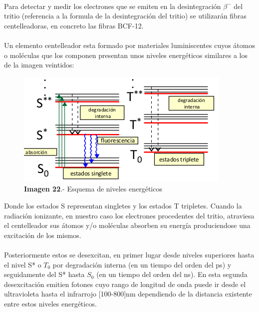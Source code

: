 \documentclass[11pt, a4paper]{article}
\begin{document}
\paragraph {}
Para detectar y medir los electrones que se emiten en la desintegración $\beta^-$ del tritio (referencia a la formula de la desintegración del tritio) se utilizarán fibras centelleadoras, en concreto las fibras BCF-12. 

\paragraph {}
Un elemento centelleador esta formado por materiales luminiscentes cuyos átomos o moléculas que los componen presentan unos niveles energéticos similares a los de la imagen veintidos:

\begin{figure}[hbtp]
\centering
\includegraphics[scale=0.5]{EsquemaNivelesFIbras.png}
\caption{\textbf{Imagen 22}.- Esquema de niveles energéticos}
\end{figure}

Donde los estados S representan singletes y los estados T tripletes. Cuando la radiación ionizante, en nuestro caso los electrones procedentes del tritio, atraviesa el centelleador sus átomos y/o moléculas absorben su energía produciendose una excitación de los mismos. 

\paragraph {}
Posteriormente estos se desexcitan, en primer lugar desde niveles superiores hasta el nivel S* o $T_0$ por degradación interna (en un tiempo del orden del ps) y seguidamente del S* hasta $S_0$ (en un tiempo del orden del ns). En esta segunda desexcitación emitien fotones cuyo rango de longitud de onda puede ir desde el ultravioleta hasta el infrarrojo [100-800]nm dependiendo de la distancia existente entre estos niveles energéticos. 
\end{document}
